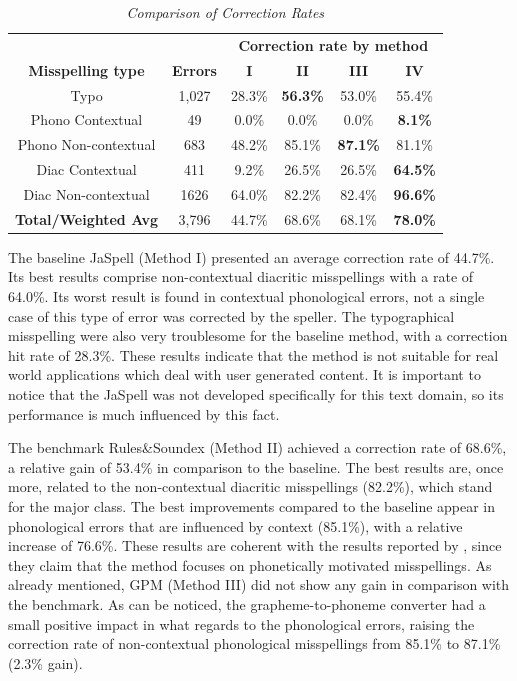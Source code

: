 {\setlength{\tabcolsep}{0.6em}
\begin{table}[htbp]
\scriptsize
\centering
\caption{\it Comparison of Correction Rates}
\begin{center}
\begin{tabular}{|cccccc|}
\hline
\multicolumn{1}{|c}{} & \multicolumn{1}{c}{} & \multicolumn{ 4}{c|}{\textbf{Correction rate by method}} \\ \cline{ 3- 6}
\multicolumn{1}{|c}{\textbf{Misspelling type}} & \multicolumn{1}{c}{\textbf{Errors}} & \multicolumn{1}{c}{\bf I} & \multicolumn{1}{c}{\bf II} & \multicolumn{1}{c}{\bf III} & \multicolumn{1}{c|}{\bf IV} \\ \hline
Typo & 1,027 & 28.3\% & \textbf{56.3\%} & 53.0\% & 55.4\% \\ 
Phono Contextual & 49 & 0.0\% & 0.0\% & 0.0\% & \textbf{8.1\%} \\ 
Phono Non-contextual & 683 & 48.2\% & 85.1\% & \textbf{87.1\%} & 81.1\% \\ 
Diac Contextual & 411 & 9.2\% & 26.5\% & 26.5\% & \textbf{64.5\%} \\ 
Diac Non-contextual & 1626 & 64.0\% & 82.2\% & 82.4\% & \textbf{96.6\%} \\ \hline
\textbf{Total/Weighted Avg} & 3,796 & 44.7\% & 68.6\% & 68.1\% & \textbf{78.0\%} \\ \hline

\end{tabular}
\end{center}
\label{tab:corr-rate-by-speller}
\end{table}
}

The baseline JaSpell (Method I) presented an average correction rate of 44.7\%. Its best results comprise non-contextual diacritic misspellings with a rate of 64.0\%. Its worst result is found in contextual phonological errors, not a single case of this type of error was corrected by the speller. The typographical
misspelling were also very troublesome for the baseline method, with a correction 
hit rate of 28.3\%. These results indicate that the method is not suitable for real world applications which deal with user generated content. It is important to notice that the JaSpell was not developed specifically for this text domain, so its performance is much influenced by this fact.

The benchmark Rules\&Soundex (Method II) achieved a correction rate of 68.6\%, a relative gain of 53.4\% in comparison to the baseline. The best results are, once more, related to the non-contextual diacritic misspellings (82.2\%), which stand for the major class. The best improvements compared to the baseline appear in phonological errors that are influenced by context (85.1\%), with a relative increase of 76.6\%. These results are coherent with the results reported by \cite{Avanco2014}, since they claim that the method focuses on phonetically motivated misspellings.
As already mentioned, GPM (Method III) did not show any gain in comparison with the benchmark. As can be noticed, the grapheme-to-phoneme converter had a small positive impact in what regards to the phonological errors, raising the correction rate of non-contextual phonological misspellings from 85.1\% to 87.1\% (2.3\% gain). 

